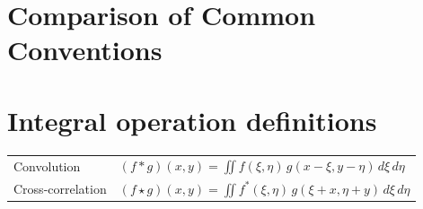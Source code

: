 
\section{Comparison of Common Conventions}



\section{Integral operation definitions}
\begin{center}
\begin{tabular}{ll}
\toprule
Convolution &
$\displaystyle
(f*g)(x,y)
=
\iint
f(\xi,\eta)\,
g(x-\xi,y-\eta)\,
d\xi\,d\eta
$
\\[0.6cm]

Cross-correlation &
$\displaystyle
(f\star g)(x,y)
=
\iint
f^{*}(\xi,\eta)\,
g(\xi+x,\eta + y)\,
d\xi\,d\eta
$
\\
\bottomrule
\end{tabular}
\end{center}